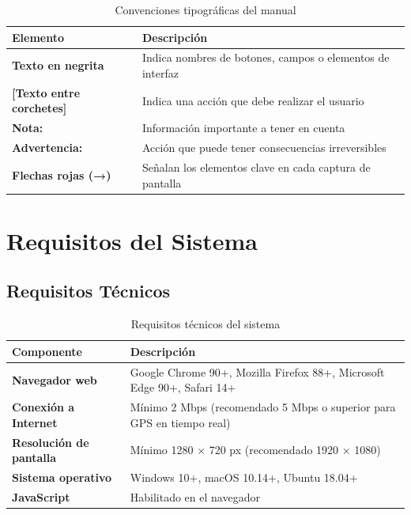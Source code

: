 \documentclass[12pt,a4paper]{report}
\begin{document}
\begin{table}[H]
  \centering
  \renewcommand{\arraystretch}{1.4}
  \begin{tabularx}{\textwidth}{@{}L{4.5cm} X@{}}
    \toprule
    \textbf{Elemento} & \textbf{Descripción} \\
    \midrule
    \textbf{Texto en negrita} & Indica nombres de botones, campos o elementos de interfaz \\
    \textbf{[Texto entre corchetes]} & Indica una acción que debe realizar el usuario \\
    \textbf{Nota:} & Información importante a tener en cuenta \\
    \textbf{Advertencia:} & Acción que puede tener consecuencias irreversibles \\
    \textbf{Flechas rojas (→)} & Señalan los elementos clave en cada captura de pantalla \\
    \bottomrule
  \end{tabularx}
  \caption{Convenciones tipográficas del manual}
\end{table}

\chapter{Requisitos del Sistema}

\section{Requisitos Técnicos}

\begin{table}[H]
  \centering
  \renewcommand{\arraystretch}{1.4}
  \begin{tabularx}{\textwidth}{@{}L{4.5cm} X@{}}
    \toprule
    \textbf{Componente} & \textbf{Descripción} \\
    \midrule
    \textbf{Navegador web} & Google Chrome 90+, Mozilla Firefox 88+, Microsoft Edge 90+, Safari 14+ \\
    \textbf{Conexión a Internet} & Mínimo 2 Mbps (recomendado 5 Mbps o superior para GPS en tiempo real) \\
    \textbf{Resolución de pantalla} & Mínimo 1280 × 720 px (recomendado 1920 × 1080) \\
    \textbf{Sistema operativo} & Windows 10+, macOS 10.14+, Ubuntu 18.04+ \\
    \textbf{JavaScript} & Habilitado en el navegador \\
    \bottomrule
  \end{tabularx}
  \caption{Requisitos técnicos del sistema}
\end{table}
\end{document}
